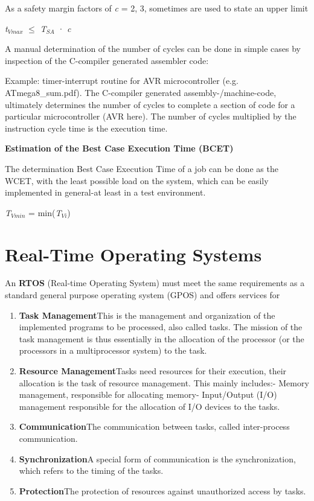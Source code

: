 As a safety margin factors of \textit{c} = 2, 3, sometimes are used to state an upper limit

\textit{t}${}_{Vmax}$ $\mathrm{\le}$ \textit{T${}_{SA}$ }· \textit{c}

A manual determination of the number of cycles can be done in simple cases by inspection of the C-compiler generated assembler code:

Example: timer-interrupt routine for AVR microcontroller (e.g. ATmega8\_sum.pdf). The C-compiler generated assembly-/machine-code, ultimately determines the number of cycles to complete a section of code for a particular microcontroller (AVR here). The number of cycles multiplied by the instruction cycle time is the execution time.

\textbf{Estimation of the Best Case Execution Time (BCET)}

The determination Best Case Execution Time of a job can be done as the WCET, with the least possible load on the system, which can be easily implemented in general-at least in a test environment.

\textit{T${}_{Vmin}$} = min(\textit{T${}_{Vi}$})

\section{   Real-Time Operating Systems}

An \textbf{RTOS} (Real-time Operating System) must meet the same requirements as a standard general purpose operating system (GPOS) and offers services for


\begin{enumerate}
	\item  \textbf{Task Management}This is the management and organization of the implemented programs to be processed, also called tasks. The mission of the task management is thus essentially in the allocation of the processor (or the processors in a multiprocessor system) to the task.
	\item  \textbf{Resource Management}Tasks need resources for their execution, their allocation is the task of resource management. This mainly includes:- Memory management, responsible for allocating memory- Input/Output (I/O) management responsible for the allocation of I/O devices to  the tasks.
	\item  \textbf{Communication}The communication between tasks, called inter-process communication.
	\item  \textbf{Synchronization}A special form of communication is the synchronization, which refers to the timing of the tasks.
	\item  \textbf{Protection}The protection of resources against unauthorized access by tasks.
\end{enumerate}

